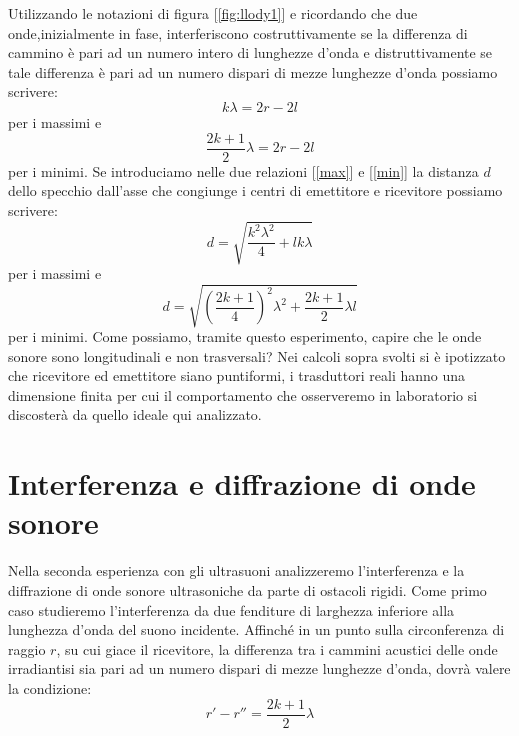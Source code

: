 \documentclass[a4paper,10pt,oneside]{article}
\begin{document}
Utilizzando le notazioni di figura [\ref{fig:llody1}] e ricordando che due onde,inizialmente in fase, interferiscono costruttivamente se la differenza di cammino è pari ad un numero intero di lunghezze d'onda e distruttivamente se tale differenza è pari ad un numero dispari di mezze lunghezze d'onda possiamo scrivere:
\begin{equation}\label{max}
 k\lambda=2r-2l
\end{equation}
per i massimi e
\begin{equation}\label{min}
 \frac{2k+1}{2}\lambda=2r-2l
\end{equation}
per i minimi.
Se introduciamo nelle due relazioni [\ref{max}] e [\ref{min}] la distanza $d$ dello specchio dall'asse che congiunge i centri di emettitore e ricevitore possiamo scrivere:
\begin{equation}\label{lloyd_dmax}
  d=\sqrt{\frac{k^2\lambda^2}{4}+lk\lambda}
\end{equation}
per i massimi e
\begin{equation}\label{llody_dmin}
 d=\sqrt{\left(\frac{2k+1}{4}\right)^2\lambda^2+\frac{2k+1}{2}\lambda l}
\end{equation}
per i minimi. Come possiamo, tramite questo esperimento, capire che le onde sonore sono longitudinali e non trasversali?
Nei calcoli sopra svolti si è ipotizzato che ricevitore ed emettitore siano puntiformi, i trasduttori reali hanno una dimensione finita per cui il comportamento che osserveremo in laboratorio si discosterà da quello ideale qui analizzato.

\section*{Interferenza e diffrazione di onde sonore}

Nella seconda esperienza con gli ultrasuoni  analizzeremo l'interferenza e la diffrazione di onde sonore ultrasoniche da parte di ostacoli rigidi. Come primo caso studieremo l'interferenza da due fenditure di larghezza inferiore alla lunghezza d'onda del suono incidente. Affinché in un punto sulla circonferenza di raggio $r$, su cui giace il ricevitore, la differenza tra i cammini acustici delle onde irradiantisi sia pari ad un numero dispari di mezze lunghezze d'onda, dovrà valere la condizione:
\begin{equation}
 r'-r''=\frac{2k+1}{2}\lambda
\end{equation}
\end{document}
